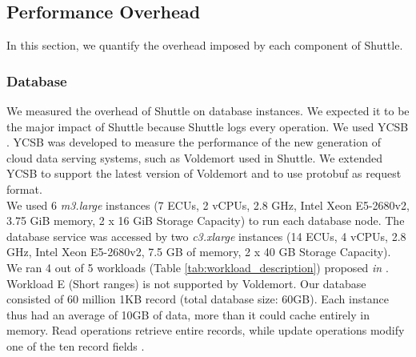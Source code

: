 \subsection{Performance Overhead}\label{sec:eval:performance}
In this section, we quantify the overhead imposed by each component of Shuttle.

\subsubsection{Database}\label{sec:eval:performance:database}
We measured the overhead of Shuttle on database instances. We expected it to be the major impact of Shuttle because Shuttle logs every operation. We used \acf{YCSB} \cite{ycsb}. \ac{YCSB} was developed to measure the performance of the new generation of cloud data serving systems, such as Voldemort used in Shuttle. We extended \ac{YCSB} to support the latest version of Voldemort and to use \acf{protobuf} as request format.\\

We used 6 \textit{m3.large} instances (7 \ac{ECU}s, 2 vCPUs, 2.8 GHz, Intel Xeon E5-2680v2, 3.75 GiB memory, 2 x 16 GiB Storage Capacity) to run each database node. The database service was accessed by two \textit{c3.xlarge} instances (14 \ac{ECU}s, 4 vCPUs, 2.8 GHz, Intel Xeon E5-2680v2, 7.5 GB of memory, 2 x 40 GB Storage Capacity).\\


We ran 4 out of 5 workloads (Table \ref{tab:workload_description}) proposed \emph{in} \cite{ycsb}. Workload E (Short ranges) is not supported by Voldemort. Our database consisted of 60 million 1KB record (total database size: 60GB). Each instance thus had an average of 10GB of data, more than it could cache entirely in memory. Read operations retrieve entire records, while update operations modify one of the ten record fields \cite{ycsb}.

